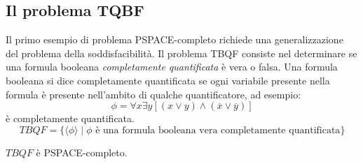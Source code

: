 \documentclass[12pt]{report}
\newcounter{theorem}
\begin{document}
\subsection{Il problema TQBF}
Il primo esempio di problema PSPACE-completo richiede una generalizzazione del problema della soddisfacibilità. Il problema TBQF consiste nel determinare se una formula booleana \textit{completamente quantificata} è vera o falsa. Una formula booleana si dice completamente quantificata se ogni variabile presente nella formula è presente nell'ambito di qualche quantificatore, ad esempio:
\[
\phi = \forall x\exists y \left[(x \vee y) \wedge (\overline{x} \vee \overline{y})\right]
\]
è completamente quantificata.
\[
TBQF = \{\langle \phi \rangle \mid \phi \text{ è una formula booleana vera completamente quantificata}\}
\]
\begin{theorem}{}{}
	$TBQF$ è PSPACE-completo.
\end{theorem}
\end{document}

